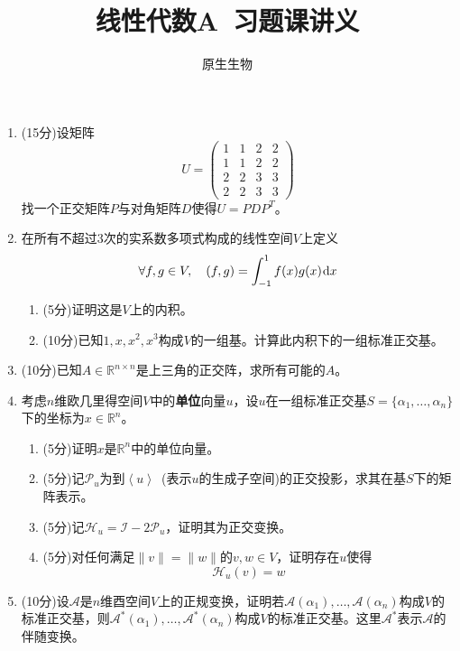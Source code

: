 \documentclass[a4paper,UTF8,fontset=windows,AutoFakeBold]{ctexart}
\title{\textbf{线性代数A\ 习题课讲义}}
\author{原生生物}
\date{}
\newcommand*{\dr}{\hspace{0.07em}\mathrm{d}}
\newcommand*{\ma}{\mathcal{A}}
\newcommand*{\mi}{\mathcal{I}}
\begin{document}
\begin{enumerate}
    \item (15分)设矩阵
    $$U=\begin{pmatrix}1&1&2&2\\1&1&2&2\\2&2&3&3\\2&2&3&3\end{pmatrix}$$
    找一个正交矩阵$P$与对角矩阵$D$使得$U=PDP^T$。

    \item 在所有不超过3次的实系数多项式构成的线性空间$V$上定义
    $$\forall f,g\in V,\quad(f,g)=\int_{-1}^1f(x)g(x)\dr x$$
    \begin{enumerate}
        \item (5分)证明这是$V$上的内积。
        \item (10分)已知$1,x,x^2,x^3$构成$V$的一组基。计算此内积下的一组标准正交基。
    \end{enumerate}

    \item (10分)已知$A\in\mathbb{R}^{n\times n}$是上三角的正交阵，求所有可能的$A$。
    
    \item 考虑$n$维欧几里得空间$V$中的\textbf{单位}向量$u$，设$u$在一组标准正交基$S=\{\alpha_1,\dots,\alpha_n\}$下的坐标为$x\in\mathbb{R}^n$。
    \begin{enumerate}
        \item (5分)证明$x$是$\mathbb{R}^n$中的单位向量。
        \item (5分)记$\mathcal{P}_u$为到$\left<u\right>$\ (表示$u$的生成子空间)的正交投影，求其在基$S$下的矩阵表示。
        \item (5分)记$\mathcal{H}_u=\mi-2\mathcal{P}_u$，证明其为正交变换。
        \item (5分)对任何满足$\|v\|=\|w\|$的$v,w\in V$，证明存在$u$使得
        $$\mathcal{H}_u(v)=w$$
    \end{enumerate}
    
    \item (10分)设$\ma$是$n$维酉空间$V$上的正规变换，证明若$\ma(\alpha_1),\dots,\ma(\alpha_n)$构成$V$的标准正交基，则$\ma^*(\alpha_1),\dots,\ma^*(\alpha_n)$构成$V$的标准正交基。这里$\ma^*$表示$\ma$的伴随变换。
    

\end{enumerate}
\end{document}
